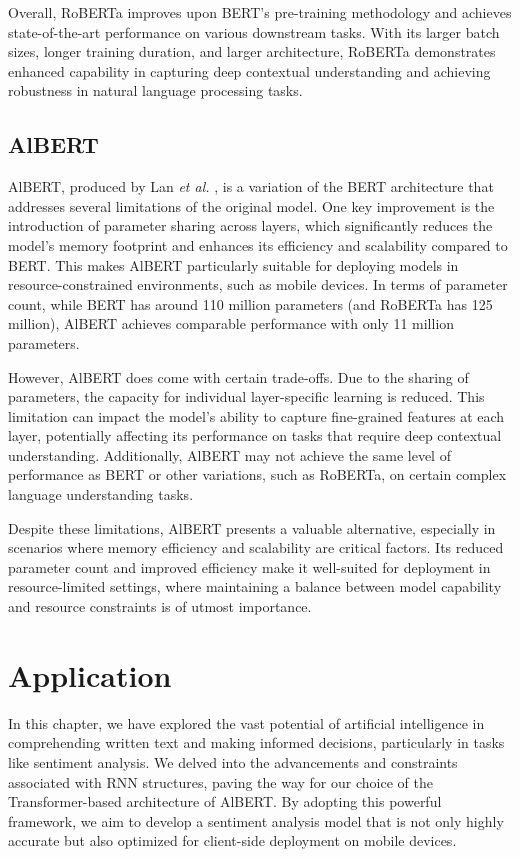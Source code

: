 Overall, RoBERTa improves upon BERT's pre-training methodology and achieves state-of-the-art performance on various downstream tasks. With its larger batch sizes, longer training duration, and larger architecture, RoBERTa demonstrates enhanced capability in capturing deep contextual understanding and achieving robustness in natural language processing tasks.

\subsection{AlBERT}

AlBERT, produced by Lan \textit{et al.} \cite{AlBERT}, is a variation of the BERT architecture that addresses several limitations of the original model. One key improvement is the introduction of parameter sharing across layers, which significantly reduces the model's memory footprint and enhances its efficiency and scalability compared to BERT. This makes AlBERT particularly suitable for deploying models in resource-constrained environments, such as mobile devices. In terms of parameter count, while BERT has around 110 million parameters (and RoBERTa has 125 million), AlBERT achieves comparable performance with only 11 million parameters.

However, AlBERT does come with certain trade-offs. Due to the sharing of parameters, the capacity for individual layer-specific learning is reduced. This limitation can impact the model's ability to capture fine-grained features at each layer, potentially affecting its performance on tasks that require deep contextual understanding. Additionally, AlBERT may not achieve the same level of performance as BERT or other variations, such as RoBERTa, on certain complex language understanding tasks.

Despite these limitations, AlBERT presents a valuable alternative, especially in scenarios where memory efficiency and scalability are critical factors. Its reduced parameter count and improved efficiency make it well-suited for deployment in resource-limited settings, where maintaining a balance between model capability and resource constraints is of utmost importance.

\section{Application}

In this chapter, we have explored the vast potential of artificial intelligence in comprehending written text and making informed decisions, particularly in tasks like sentiment analysis. We delved into the advancements and constraints associated with RNN structures, paving the way for our choice of the Transformer-based architecture of AlBERT. By adopting this powerful framework, we aim to develop a sentiment analysis model that is not only highly accurate but also optimized for client-side deployment on mobile devices.